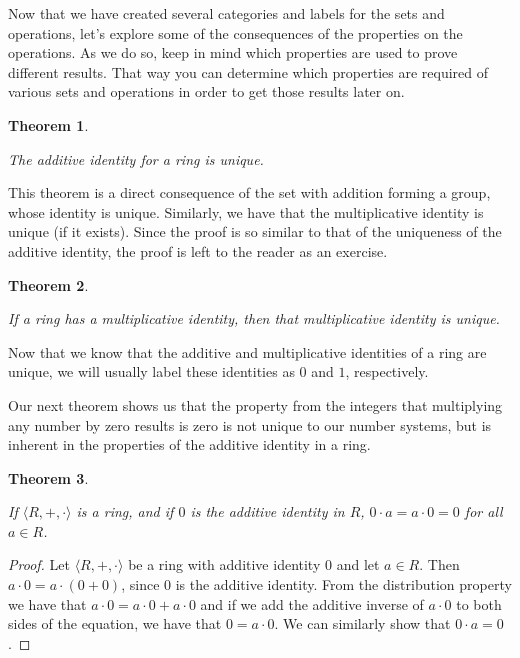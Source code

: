 \documentclass[
]{book}
\newtheorem{theorem}{Theorem}[chapter]
\theoremstyle{definition}
\theoremstyle{definition}
\theoremstyle{definition}
\theoremstyle{definition}
\theoremstyle{remark}
\begin{document}
Now that we have created several categories and labels for the sets and operations, let's explore some of the consequences of the properties on the operations. As we do so, keep in mind which properties are used to prove different results. That way you can determine which properties are required of various sets and operations in order to get those results later on.

\begin{theorem}
\protect\hypertarget{thm:unlabeled-div-94}{}\label{thm:unlabeled-div-94}

The additive identity for a ring is unique.

\end{theorem}

This theorem is a direct consequence of the set with addition forming a group, whose identity is unique. Similarly, we have that the multiplicative identity is unique (if it exists). Since the proof is so similar to that of the uniqueness of the additive identity, the proof is left to the reader as an exercise.

\begin{theorem}
\protect\hypertarget{thm:multiplicative-identity}{}\label{thm:multiplicative-identity}

If a ring has a multiplicative identity, then that multiplicative identity is unique.

\end{theorem}

Now that we know that the additive and multiplicative identities of a ring are unique, we will usually label these identities as \(0\) and \(1\), respectively.

Our next theorem shows us that the property from the integers that multiplying any number by zero results is zero is not unique to our number systems, but is inherent in the properties of the additive identity in a ring.

\begin{theorem}
\protect\hypertarget{thm:zero-multiplication}{}\label{thm:zero-multiplication}

If \(\langle R,+,\cdot\rangle\) is a ring, and if \(0\) is the additive identity in \(R\), \(0\cdot a=a\cdot 0=0\) for all \(a\in R\).

\end{theorem}

\begin{proof}

Let \(\langle R,+,\cdot\rangle\) be a ring with additive identity \(0\) and let \(a\in R\). Then \(a \cdot 0 = a \cdot (0+0)\), since \(0\) is the additive identity. From the distribution property we have that \(a \cdot 0 = a \cdot 0 + a \cdot 0\) and if we add the additive inverse of \(a \cdot 0\) to both sides of the equation, we have that \(0=a\cdot 0\). We can similarly show that \(0\cdot a=0\).

\end{proof}
\end{document}
